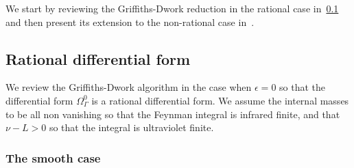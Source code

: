 \documentclass[a4paper,12pt]{article}
\numberwithin{equation}{section}
\numberwithin{figure}{subsection}
\theoremstyle{plain}
\theoremstyle{plain}
\theoremstyle{definition}
\theoremstyle{plain}
\theoremstyle{remark}
\theoremstyle{plain}
\begin{document}
  We start by reviewing the Griffiths-Dwork reduction in the rational
  case in~\ref{sec:rati-diff-form} and then present its extension to
  the non-rational case in~\label{sec:non-rati-diff-form}.
\subsection{Rational differential form}
\label{sec:rati-diff-form}

We review the Griffiths-Dwork algorithm in the case  
when $\epsilon=0$ so that the differential form
$\Omega^0_\Gamma$ is a rational differential form. We assume the
internal masses to be all non vanishing so that the Feynman
integral is infrared finite, and that $\nu -L>0$ so that the integral
is ultraviolet finite.
\subsubsection{The smooth case}
\label{sec:smooth-case}
\end{document}
